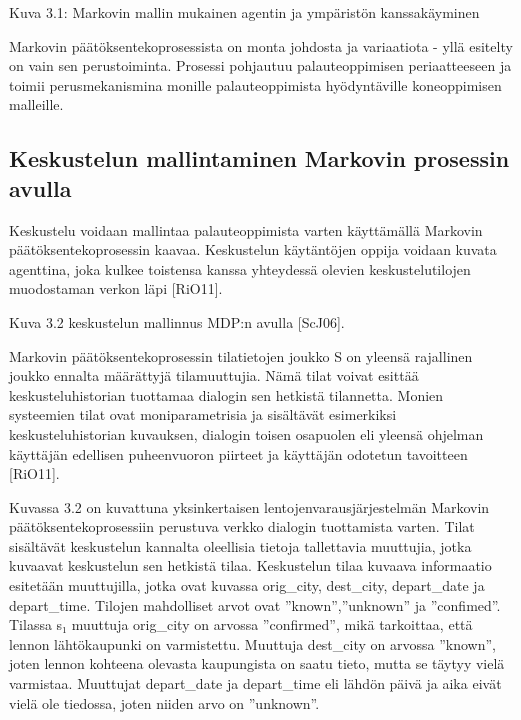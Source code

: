 \documentclass[finnish]{tktltiki2}
\theoremstyle{definition}
\theoremstyle{remark}
\begin{document}
 
Kuva 3.1: Markovin mallin mukainen agentin ja ympäristön kanssakäyminen 
 
Markovin päätöksentekoprosessista on monta johdosta ja variaatiota - yllä esitelty on vain sen perustoiminta. Prosessi pohjautuu palauteoppimisen periaatteeseen ja toimii perusmekanismina monille palauteoppimista hyödyntäville koneoppimisen malleille.

\subsection{Keskustelun mallintaminen Markovin prosessin avulla}

Keskustelu voidaan mallintaa palauteoppimista varten käyttämällä Markovin päätöksentekoprosessin kaavaa. Keskustelun käytäntöjen oppija voidaan kuvata agenttina, joka kulkee toistensa kanssa yhteydessä olevien keskustelutilojen muodostaman verkon läpi [RiO11]. 
 
 
Kuva 3.2 keskustelun mallinnus MDP:n avulla [ScJ06]. 
 
Markovin päätöksentekoprosessin tilatietojen joukko S on yleensä rajallinen joukko ennalta määrättyjä tilamuuttujia. Nämä tilat voivat esittää keskusteluhistorian tuottamaa dialogin sen hetkistä tilannetta. Monien systeemien tilat ovat moniparametrisia ja sisältävät esimerkiksi keskusteluhistorian kuvauksen, dialogin toisen osapuolen eli yleensä ohjelman käyttäjän edellisen puheenvuoron piirteet ja käyttäjän odotetun tavoitteen [RiO11].   
 
Kuvassa 3.2 on kuvattuna yksinkertaisen lentojenvarausjärjestelmän Markovin päätöksentekoprosessiin perustuva verkko dialogin tuottamista varten. Tilat sisältävät keskustelun kannalta oleellisia tietoja tallettavia muuttujia, jotka kuvaavat keskustelun sen hetkistä tilaa. Keskustelun tilaa kuvaava informaatio esitetään muuttujilla, jotka ovat kuvassa orig_city, dest_city, depart_date ja depart_time. Tilojen mahdolliset arvot ovat ”known”,”unknown” ja ”confimed”. Tilassa s₁ muuttuja orig_city on arvossa ”confirmed”, mikä tarkoittaa, että lennon lähtökaupunki on varmistettu. Muuttuja dest_city on arvossa ”known”, joten lennon kohteena olevasta kaupungista on saatu tieto, mutta se täytyy vielä varmistaa. Muuttujat depart_date ja depart_time eli lähdön päivä ja aika eivät vielä ole tiedossa, joten niiden arvo on ”unknown”. 
 
\end{document}
